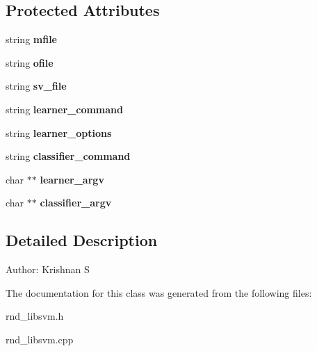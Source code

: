 \subsection*{Protected Attributes}
\begin{CompactItemize}
\item 
string \textbf{mfile}\label{classRND__LIBSVM_11d4d24c02d19c8388eda93dd982a7f5}

\item 
string \textbf{ofile}\label{classRND__LIBSVM_2f9e573d63050019f21c0d1535ae0496}

\item 
string \textbf{sv\_\-file}\label{classRND__LIBSVM_a155b3481defcf53b46b070e3ec19fb1}

\item 
string \textbf{learner\_\-command}\label{classRND__LIBSVM_98284d655f1404638350f78fee16f587}

\item 
string \textbf{learner\_\-options}\label{classRND__LIBSVM_5a8035f39c71e296d550414f7eb02128}

\item 
string \textbf{classifier\_\-command}\label{classRND__LIBSVM_4835f052792e7ea508932d5b620337f3}

\item 
char $\ast$$\ast$ \textbf{learner\_\-argv}\label{classRND__LIBSVM_fff77fa8d8e5440ce980b1e5551d69a1}

\item 
char $\ast$$\ast$ \textbf{classifier\_\-argv}\label{classRND__LIBSVM_2ddc032d2fede1ee44c3289a1f35a2d5}

\end{CompactItemize}


\subsection{Detailed Description}
\begin{Desc}
\item[Author:]Krishnan S \end{Desc}




The documentation for this class was generated from the following files:\begin{CompactItemize}
\item 
rnd\_\-libsvm.h\item 
rnd\_\-libsvm.cpp\end{CompactItemize}
